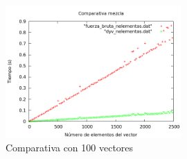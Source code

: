 \begin{figure}[htb] 
\centering
	\includegraphics[width=0.6\textwidth]{../Obligatorio/Graficas/comparativa_nelementos.png}
	\caption{Comparativa con 100 vectores} 
	\label{fig:comp_nelementos} 
\end{figure}

\newpage
\newpage


